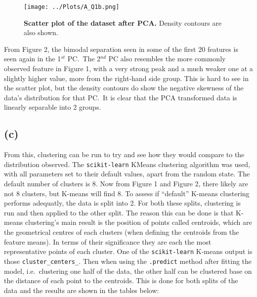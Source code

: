 \documentclass[12pt]{report} %
\begin{document}
\begin{figure}[h]
    \centering
    \texttt{[image: ../Plots/A\_Q1b.png]}
    \caption{\textbf{Scatter plot of the dataset after PCA.} Density contours are also shown.}
\end{figure}

From Figure 2, the bimodal separation seen in some of the first 20 features is seen again in the 1$^{st}$ PC.\ The 2$^{nd}$ PC also resembles the more commonly observed feature in Figure 1, with a very strong peak and a much weaker one at a slightly higher value, more from the right-hand side group. This is hard to see in the scatter plot, but the density contours do show the negative skewness of the data's distribution for that PC.\ It is clear that the PCA transformed data is linearly separable into 2 groups.

\subsection*{(c)}

From this, clustering can be run to try and see how they would compare to the distribution observed. The \texttt{scikit-learn} KMeans clustering algorithm was used, with all parameters set to their default values, apart from the random state.
The default number of clusters is 8\cite{kmeans_sklearn}. Now from Figure 1 and Figure 2, there likely are not 8 clusters, but K-means will find 8. To assess if ``default'' K-means clustering performs adequatly, the data is split into 2. For both these splits, clustering is run and then applied to the other split.  
The reason this can be done is that K-means clustering's main result is the position of points called centroids, which are the geometrical centres of each clusters (when defining the centroids from the feature means). In terms of their significance they are each the most representative points of each cluster\cite[p. 243]{sklearn_book}. One of the \texttt{scikit-learn} K-means output is those \texttt{cluster\_centers\_}. Then when using the \texttt{.predict{}} method after fitting the model, i.e.\ clustering one half of the data, the other half can be clustered base on the distance of each point to the centroids. This is done for both splits of the data and the results are shown in the tables below:
\end{document}
